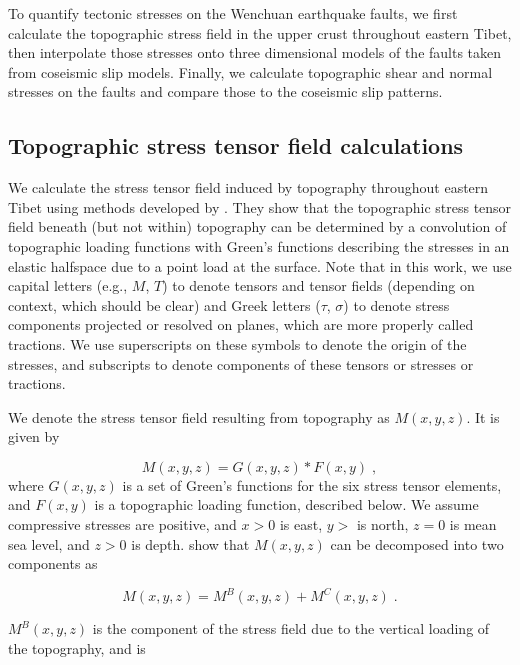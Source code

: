 \documentclass[draft,jgrga]{AGUTeX}
\begin{document}
\begin{article}
To quantify tectonic stresses on the Wenchuan earthquake faults, we
first calculate the topographic stress field in the upper crust
throughout eastern Tibet, then interpolate those stresses onto three
dimensional models of the faults taken from coseismic slip models.
Finally, we calculate topographic shear and normal stresses on the
faults and compare those to the coseismic slip patterns.

\subsection{Topographic stress tensor field
calculations}\label{topographic-stress-tensor-field-calculations}

We calculate the stress tensor field induced by topography throughout
eastern Tibet using methods developed by 
\citet{liuzoback1992}. They show that the topographic stress tensor
field beneath (but not within) topography can be determined by a convolution of
topographic loading functions with Green's functions describing the stresses in
an elastic halfspace due to a point load at the surface. Note that in this
work, we use capital letters (e.g., $M$, $T$) to denote tensors and tensor
fields (depending on context, which should be clear) and Greek letters ($\tau$,
$\sigma$) to denote stress components projected or resolved on planes, which
are more properly called tractions. We use superscripts on these symbols to
denote the origin of the stresses, and subscripts to denote components of these
tensors or stresses or tractions.  

We denote the stress tensor field resulting from topography as $M(x,y,z)$. It
is given by

\begin{equation}
M(x, y, z) = G(x, y, z) * F(x, y) \; ,
\end{equation}
where $G(x,y,z)$ is a set of Green's functions for the six stress
tensor elements, and $F(x,y)$ is a topographic loading function,
described below. We assume compressive stresses are positive, and
$x>0$ is east, $y>$ is north, $z=0$ is mean sea level, and $z>0$ is
depth. \citet{liuzoback1992} show that $M(x,y,z)$ can be decomposed
into two components as

\begin{equation}
M(x,y,z) = M^B(x,y,z) + M^C(x,y,z) \; .
\end{equation}

$M^B(x,y,z)$ is the component of the stress field due to the vertical
loading of the topography, and is


\end{article}
\end{document}
